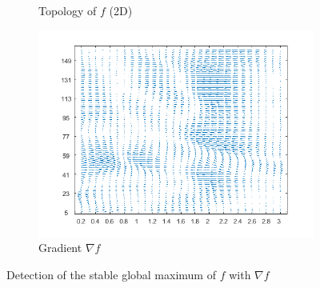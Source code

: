\documentclass[11pt,a4,twosided,singlespacing,titlepagenumber=on]{scrreprt}
\numberwithin{equation}{chapter} %
\theoremstyle{remark}
\begin{document}
\begin{figure}[H]
\begin{subfigure}[t]{0.32\textwidth}
        \caption{Topology of $f$ (2D)}
        \label{vol_mod_sma}
    \end{subfigure}
    \begin{subfigure}[t]{0.32\textwidth}
        \centering
        \includegraphics[width=1\textwidth]{surf/3}
        \caption{Gradient $\nabla f$}
        \label{vol_mod_sma}
    \end{subfigure}
    \caption{Detection of the stable global maximum of $f$ with $\nabla f$}
    \label{fig:sharpe_ratio_topology}
\end{figure}
\end{document}
